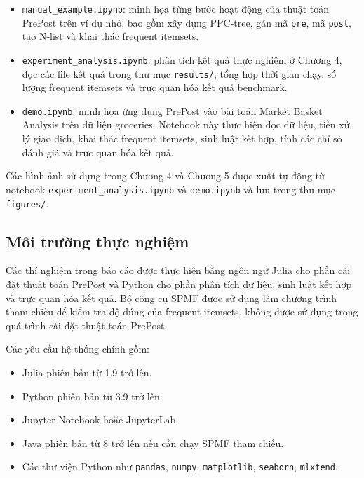 \documentclass[12pt,a4paper]{article}
\begin{document}
\begin{itemize}
    \item \texttt{manual\_example.ipynb}: minh họa từng bước hoạt động của thuật toán PrePost trên ví dụ nhỏ, bao gồm xây dựng PPC-tree, gán mã \texttt{pre}, mã \texttt{post}, tạo N-list và khai thác frequent itemsets.
    
    \item \texttt{experiment\_analysis.ipynb}: phân tích kết quả thực nghiệm ở Chương 4, đọc các file kết quả trong thư mục \texttt{results/}, tổng hợp thời gian chạy, số lượng frequent itemsets và trực quan hóa kết quả benchmark.
    
    \item \texttt{demo.ipynb}: minh họa ứng dụng PrePost vào bài toán Market Basket Analysis trên dữ liệu groceries. Notebook này thực hiện đọc dữ liệu, tiền xử lý giao dịch, khai thác frequent itemsets, sinh luật kết hợp, tính các chỉ số đánh giá và trực quan hóa kết quả.
\end{itemize}

Các hình ảnh sử dụng trong Chương 4 và Chương 5 được xuất tự động từ notebook \texttt{experiment\_analysis.ipynb} và \texttt{demo.ipynb} và lưu trong thư mục \texttt{figures/}.

\subsection{Môi trường thực nghiệm}

Các thí nghiệm trong báo cáo được thực hiện bằng ngôn ngữ Julia cho phần cài đặt thuật toán PrePost và Python cho phần phân tích dữ liệu, sinh luật kết hợp và trực quan hóa kết quả. Bộ công cụ SPMF được sử dụng làm chương trình tham chiếu để kiểm tra độ đúng của frequent itemsets, không được sử dụng trong quá trình cài đặt thuật toán PrePost.

Các yêu cầu hệ thống chính gồm:

\begin{itemize}
    \item Julia phiên bản từ 1.9 trở lên.
    \item Python phiên bản từ 3.9 trở lên.
    \item Jupyter Notebook hoặc JupyterLab.
    \item Java phiên bản từ 8 trở lên nếu cần chạy SPMF tham chiếu.
    \item Các thư viện Python như \texttt{pandas}, \texttt{numpy}, \texttt{matplotlib}, \texttt{seaborn}, \texttt{mlxtend}.
\end{itemize}
\end{document}
